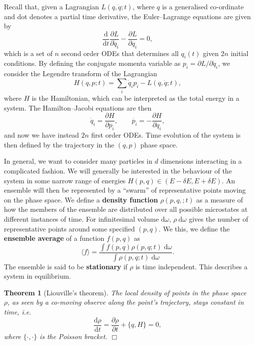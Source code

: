 \documentclass[letter-paper]{tufte-book}
\newtheorem{theorem}{\color{pastel-blue}Theorem}[section]
\newcommand\Def[1]{\textbf{#1}}
\newcommand{\qedwhite}{\hfill \ensuremath{\Box}}
\begin{document}
Recall that, given a Lagrangian $L(q, \dot{q}; t)$, where $q$ is a generalised
co-ordinate and dot denotes a partial time derivative, the Euler--Lagrange
equations are given by
\begin{equation}
  \frac{\mathrm{d}}{\mathrm{d}t}\frac{\partial L}{\partial \dot{q}_i} - \frac{\partial L}{\partial q_i} = 0,
\end{equation}
which is a set of $n$ second order ODEs that determines all $q_i(t)$ given $2n$
initial conditions. By defining the conjugate momenta variable as $p_i =
\partial L / \partial \dot{q}_i$, we consider the Legendre transform of the
Lagrangian
\begin{equation*}
  H(q, p; t) = \sum_i \dot{q}_i p_i - L(q, \dot{q}; t),
\end{equation*}
where $H$ is the Hamiltonian, which can be interpreted as the total energy in a
system. The Hamilton--Jacobi equations are then
\begin{equation}
  \dot{q}_i = \frac{\partial H}{\partial p_i}, \qquad \dot{p_i} = -\frac{\partial H}{\partial q_i},
\end{equation}
and now we have instead $2n$ first order ODEs. Time evolution of the system is
then defined by the trajectory in the $(q,p)$ phase space.

In general, we want to consider many particles in $d$ dimensions interacting in
a complicated fashion. We will generally be interested in the behaviour of the
system in some narrow range of energies $H(p,q) \in (E-\delta E, E+\delta E)$.
An ensemble will then be represented by a ``swarm'' of representative points
moving on the phase space. We define a \Def{density function} $\rho(p,q,;t)$ as
a measure of how the members of the ensemble are distributed over all possible
microstates at different instances of time. For infinitesimal volume
$\mathrm{d}\omega$, $\rho\ \mathrm{d}\omega$ gives the number of representative
points around some specified $(p,q)$. We this, we define the \Def{ensemble
average} of a function $f(p,q)$ as
\begin{equation}
  \langle f \rangle = \frac{\int f(p, q) \rho(p, q; t)\; \mathrm{d}\omega}{\int \rho(p, q; t)\; \mathrm{d}\omega}.
\end{equation}
The ensemble is said to be \Def{stationary} if $\rho$ is time independent. This
describes a system in equilibrium.

\begin{theorem}[Liouville's theorem]
The local density of points in the phase space $\rho$, as seen by a co-moving
observe along the point's trajectory, stays constant in time, i.e.
\begin{equation*}
  \frac{\mathrm{d}\rho}{\mathrm{d}t} = \frac{\partial \rho}{\partial t} + \{q, H\} = 0,
\end{equation*}
where $\{\cdot,\cdot\}$ is the Poisson bracket. \qedwhite
\end{theorem}
\end{document}
